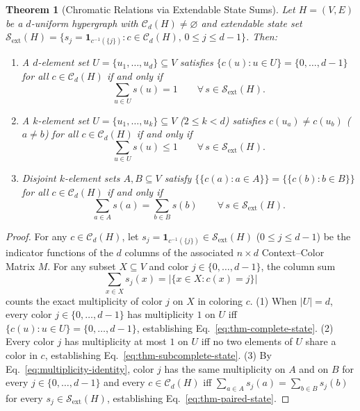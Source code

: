 \documentclass[aps,pra,reprint,superscriptaddress,longbibliography,nofootinbib,floatfix,10pt]{revtex4-2}
\newtheorem{theorem}{Theorem}
\theoremstyle{definition}\newtheorem{definition}[theorem]{Definition}
\theoremstyle{remark}\newtheorem{remark}[theorem]{Remark}
\newcommand{\Sc}{\mathcal S}\newcommand{\Cc}{\mathcal C}\newcommand{\Wc}{\mathcal W}
\begin{document}
\begin{theorem}[Chromatic Relations via Extendable State Sums]\label{thm:chromatic-conservation}
Let $H=(V,E)$ be a $d$-uniform hypergraph with $\Cc_d(H)\neq\varnothing$ and extendable state set $\Sc_{\mathrm{ext}}(H)=\{s_j=\mathbf{1}_{c^{-1}(\{j\})}:c\in\Cc_d(H),\,0\le j\le d-1\}$. Then:
\begin{enumerate}
\item A $d$-element set $U=\{u_1,\ldots,u_d\}\subseteq V$ satisfies $\{c(u):u\in U\}=\{0,\ldots,d-1\}$ for all $c\in\Cc_d(H)$ if and only if
\begin{equation}\label{eq:thm-complete-state}
\sum_{u\in U} s(u) = 1 \qquad \forall\, s\in\Sc_{\mathrm{ext}}(H).
\end{equation}
\item A $k$-element set $U=\{u_1,\ldots,u_k\}\subseteq V$ ($2\le k<d$) satisfies $c(u_a)\neq c(u_b)$ ($a\neq b$) for all $c\in\Cc_d(H)$ if and only if
\begin{equation}\label{eq:thm-subcomplete-state}
\sum_{u\in U} s(u) \le 1 \qquad \forall\, s\in\Sc_{\mathrm{ext}}(H).
\end{equation}
\item Disjoint $k$-element sets $A,B\subseteq V$ satisfy $\{\!\{c(a):a\in A\}\!\}=\{\!\{c(b):b\in B\}\!\}$ for all $c\in\Cc_d(H)$ if and only if
\begin{equation}\label{eq:thm-paired-state}
\sum_{a\in A} s(a) = \sum_{b\in B} s(b) \qquad \forall\, s\in\Sc_{\mathrm{ext}}(H).
\end{equation}
\end{enumerate}
\end{theorem}
\begin{proof}
For any $c\in\Cc_d(H)$, let $s_j=\mathbf{1}_{c^{-1}(\{j\})}\in\Sc_{\mathrm{ext}}(H)$ ($0\le j\le d-1$) be the indicator functions of the $d$ columns of the associated $n\times d$ Context--Color Matrix $M$. For any subset $X\subseteq V$ and color $j\in\{0,\ldots,d-1\}$, the column sum
\begin{equation}\label{eq:multiplicity-identity}
\sum_{x\in X} s_j(x) = \bigl|\{x\in X: c(x)=j\}\bigr|
\end{equation}
counts the exact multiplicity of color $j$ on $X$ in coloring $c$.
(1) When $|U|=d$, every color $j\in\{0,\ldots,d-1\}$ has multiplicity $1$ on $U$ iff $\{c(u):u\in U\}=\{0,\ldots,d-1\}$, establishing Eq.~\eqref{eq:thm-complete-state}.
(2) Every color $j$ has multiplicity at most $1$ on $U$ iff no two elements of $U$ share a color in $c$, establishing Eq.~\eqref{eq:thm-subcomplete-state}.
(3) By Eq.~\eqref{eq:multiplicity-identity}, color $j$ has the same multiplicity on $A$ and on $B$ for every $j\in\{0,\ldots,d-1\}$ and every $c\in\Cc_d(H)$ iff $\sum_{a\in A}s_j(a)=\sum_{b\in B}s_j(b)$ for every $s_j\in\Sc_{\mathrm{ext}}(H)$, establishing Eq.~\eqref{eq:thm-paired-state}.
\end{proof}
\end{document}
